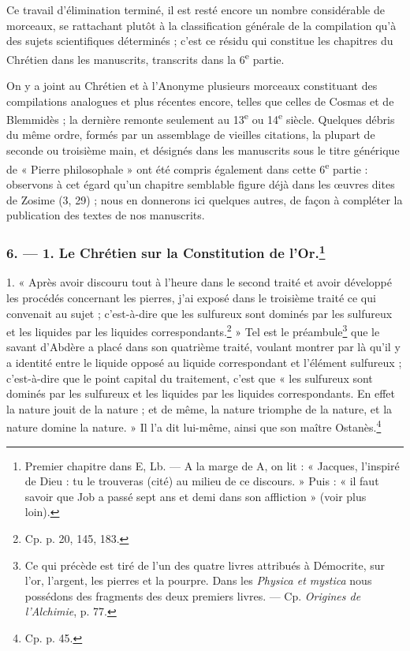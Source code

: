 \documentclass[a4paper, 11pt, oneside, polutonikogreek, french]{article}
\begin{document}
Ce travail d'élimination terminé, il est resté encore un nombre considérable de morceaux, se rattachant plutôt à la classification générale de la compilation qu'à des sujets scientifiques déterminés ; c'est ce résidu qui constitue les chapitres du Chrétien dans les manuscrits, transcrits dans la 6\textsuperscript{e} partie.

On y a joint au Chrétien et à l'Anonyme plusieurs morceaux constituant des compilations analogues et plus récentes encore, telles que celles de Cosmas et de Blemmidès ; la dernière remonte seulement au 13\textsuperscript{e} ou 14\textsuperscript{e} siècle. Quelques débris du même ordre, formés par un assemblage de vieilles citations, la plupart de seconde ou troisième main, et désignés dans les manuscrits sous le titre générique de « Pierre philosophale » ont été compris également dans cette 6\textsuperscript{e} partie : observons à cet égard qu'un chapitre semblable figure déjà dans les œuvres dites de Zosime (3, 29) ; nous en donnerons ici quelques autres, de façon à compléter la publication des textes de nos manuscrits.

\bigskip
\centerline{\EightStarTaper}
\centerline{\EightStarTaper\EightStarTaper}
\bigskip

\subsubsection[6. --- 1. Le Chrétien sur la Constitution de l'Or.]{6. --- 1. Le Chrétien sur la Constitution de l'Or.\footnote{Premier chapitre dans E, Lb. --- A la marge de A, on lit : « Jacques, l'inspiré de Dieu : tu le trouveras (cité) au milieu de ce discours. » Puis : « il faut savoir que Job a passé sept ans et demi dans son affliction » (voir plus loin).}}

1. « Après avoir discouru tout à l'heure dans le second traité et avoir développé les procédés concernant les pierres, j'ai exposé dans le troisième traité ce qui convenait au sujet ; c'est-à-dire que les sulfureux sont dominés par les sulfureux et les liquides par les liquides correspondants.\footnote{Cp. p. 20, 145, 183.} » Tel est le préambule\footnote{Ce qui précède est tiré de l'un des quatre livres attribués à Démocrite, sur l'or, l'argent, les pierres et la pourpre. Dans les \emph{Physica et mystica} nous possédons des fragments des deux premiers livres. --- Cp. \emph{Origines de l'Alchimie}, p. 77.} que le savant d'Abdère a placé dans son quatrième traité, voulant montrer par là qu'il y a identité entre le liquide opposé au liquide correspondant et l'élément sulfureux ; c'est-à-dire que le point capital du traitement, c'est que « les sulfureux sont dominés par les sulfureux et les liquides par les liquides correspondants. En effet la nature jouit de la nature ; et de même, la nature triomphe de la nature, et la nature domine la nature. » Il l'a dit lui-même, ainsi que son maître Ostanès.\footnote{Cp. p. 45.}
\end{document}
